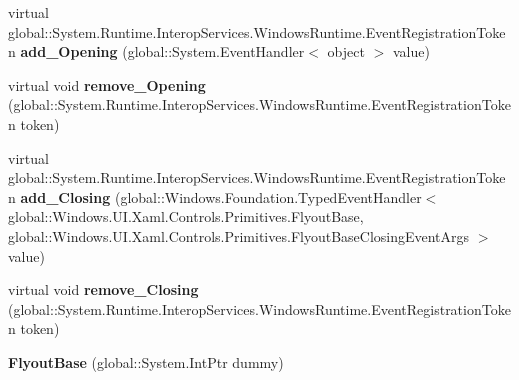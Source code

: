 \begin{DoxyCompactItemize}
\item 
\mbox{\label{class_windows_1_1_u_i_1_1_xaml_1_1_controls_1_1_primitives_1_1_flyout_base_a8dbfb4d3df5e017a006229b035558c61}} 
virtual global\+::\+System.\+Runtime.\+Interop\+Services.\+Windows\+Runtime.\+Event\+Registration\+Token {\bfseries add\+\_\+\+Opening} (global\+::\+System.\+Event\+Handler$<$ object $>$ value)
\item 
\mbox{\label{class_windows_1_1_u_i_1_1_xaml_1_1_controls_1_1_primitives_1_1_flyout_base_a24e892a50720e9b950a86332383a641c}} 
virtual void {\bfseries remove\+\_\+\+Opening} (global\+::\+System.\+Runtime.\+Interop\+Services.\+Windows\+Runtime.\+Event\+Registration\+Token token)
\item 
\mbox{\label{class_windows_1_1_u_i_1_1_xaml_1_1_controls_1_1_primitives_1_1_flyout_base_a048b76cc08a938c4371b9bc74777d73a}} 
virtual global\+::\+System.\+Runtime.\+Interop\+Services.\+Windows\+Runtime.\+Event\+Registration\+Token {\bfseries add\+\_\+\+Closing} (global\+::\+Windows.\+Foundation.\+Typed\+Event\+Handler$<$ global\+::\+Windows.\+U\+I.\+Xaml.\+Controls.\+Primitives.\+Flyout\+Base, global\+::\+Windows.\+U\+I.\+Xaml.\+Controls.\+Primitives.\+Flyout\+Base\+Closing\+Event\+Args $>$ value)
\item 
\mbox{\label{class_windows_1_1_u_i_1_1_xaml_1_1_controls_1_1_primitives_1_1_flyout_base_a3d2a27eaf9daaa9e54e906ae772bc53b}} 
virtual void {\bfseries remove\+\_\+\+Closing} (global\+::\+System.\+Runtime.\+Interop\+Services.\+Windows\+Runtime.\+Event\+Registration\+Token token)
\item 
\mbox{\label{class_windows_1_1_u_i_1_1_xaml_1_1_controls_1_1_primitives_1_1_flyout_base_aa5806d40967d26c2011e0427640dd885}} 
{\bfseries Flyout\+Base} (global\+::\+System.\+Int\+Ptr dummy)
\item 
\mbox{\label{class_windows_1_1_u_i_1_1_xaml_1_1_controls_1_1_primitives_1_1_flyout_base_a897348c50b44a1e97d0d95c49c1bd853}} 

\end{DoxyCompactItemize}
